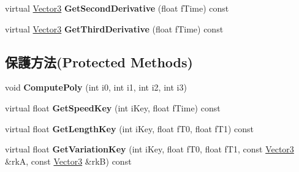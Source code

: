 \begin{DoxyCompactItemize}
\item 
virtual \hyperlink{class_i_dream_sky_1_1_vector3}{Vector3} {\bfseries Get\+Second\+Derivative} (float f\+Time) const \hypertarget{class_i_dream_sky_1_1_t_c_b_spline3_a2b1b3ece9d430582a808f1c966e31b2f}{}\label{class_i_dream_sky_1_1_t_c_b_spline3_a2b1b3ece9d430582a808f1c966e31b2f}

\item 
virtual \hyperlink{class_i_dream_sky_1_1_vector3}{Vector3} {\bfseries Get\+Third\+Derivative} (float f\+Time) const \hypertarget{class_i_dream_sky_1_1_t_c_b_spline3_a0fd5ac0274c9a92002c5b7fd8d76bc2e}{}\label{class_i_dream_sky_1_1_t_c_b_spline3_a0fd5ac0274c9a92002c5b7fd8d76bc2e}

\end{DoxyCompactItemize}
\subsection*{保護方法(Protected Methods)}
\begin{DoxyCompactItemize}
\item 
void {\bfseries Compute\+Poly} (int i0, int i1, int i2, int i3)\hypertarget{class_i_dream_sky_1_1_t_c_b_spline3_aafb4e7ff6a1ae3f9b7ee99cdb59f6dd0}{}\label{class_i_dream_sky_1_1_t_c_b_spline3_aafb4e7ff6a1ae3f9b7ee99cdb59f6dd0}

\item 
virtual float {\bfseries Get\+Speed\+Key} (int i\+Key, float f\+Time) const \hypertarget{class_i_dream_sky_1_1_t_c_b_spline3_a61c70204b6573ff018692fcb9f8d236d}{}\label{class_i_dream_sky_1_1_t_c_b_spline3_a61c70204b6573ff018692fcb9f8d236d}

\item 
virtual float {\bfseries Get\+Length\+Key} (int i\+Key, float f\+T0, float f\+T1) const \hypertarget{class_i_dream_sky_1_1_t_c_b_spline3_a3b70ac52fbf8c927bf45e41fd7a9bc68}{}\label{class_i_dream_sky_1_1_t_c_b_spline3_a3b70ac52fbf8c927bf45e41fd7a9bc68}

\item 
virtual float {\bfseries Get\+Variation\+Key} (int i\+Key, float f\+T0, float f\+T1, const \hyperlink{class_i_dream_sky_1_1_vector3}{Vector3} \&rkA, const \hyperlink{class_i_dream_sky_1_1_vector3}{Vector3} \&rkB) const \hypertarget{class_i_dream_sky_1_1_t_c_b_spline3_a6c9326a263e8debcd6631fc4ebcdbb10}{}\label{class_i_dream_sky_1_1_t_c_b_spline3_a6c9326a263e8debcd6631fc4ebcdbb10}

\end{DoxyCompactItemize}

